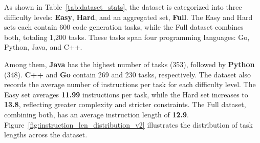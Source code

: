 
As shown in Table~\ref{tab:dataset_stats}, the dataset is categorized into three difficulty levels: \textbf{Easy}, \textbf{Hard}, and an aggregated set, \textbf{Full}. The Easy and Hard sets each contain 600 code generation tasks, while the Full dataset combines both, totaling 1,200 tasks. These tasks span four programming languages: Go, Python, Java, and C++.

Among them, \textbf{Java} has the highest number of tasks (353), followed by \textbf{Python} (348). \textbf{C++} and \textbf{Go} contain 269 and 230 tasks, respectively. The dataset also records the average number of instructions per task for each difficulty level. The Easy set averages \textbf{11.99} instructions per task, while the Hard set increases to \textbf{13.8}, reflecting greater complexity and stricter constraints. The Full dataset, combining both, has an average instruction length of \textbf{12.9}. Figure~\ref{fig:instruction_len_distribution_v2} illustrates the distribution of task lengths across the dataset.



